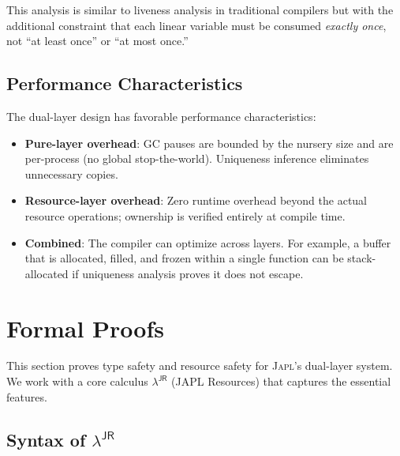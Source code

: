 \documentclass[11pt]{article}
\newcommand{\JAPL}{\textsc{Japl}}
\begin{document}
This analysis is similar to liveness analysis in traditional compilers
but with the additional constraint that each linear variable must be
consumed \emph{exactly once}, not ``at least once'' or ``at most
once.''

\subsection{Performance Characteristics}

The dual-layer design has favorable performance characteristics:

\begin{itemize}
  \item \textbf{Pure-layer overhead}: GC pauses are bounded by the
        nursery size and are per-process (no global stop-the-world).
        Uniqueness inference eliminates unnecessary copies.
  \item \textbf{Resource-layer overhead}: Zero runtime overhead beyond
        the actual resource operations; ownership is verified entirely
        at compile time.
  \item \textbf{Combined}: The compiler can optimize across layers.
        For example, a buffer that is allocated, filled, and frozen
        within a single function can be stack-allocated if uniqueness
        analysis proves it does not escape.
\end{itemize}


\section{Formal Proofs}\label{sec:proofs}

This section proves type safety and resource safety for \JAPL{}'s
dual-layer system.  We work with a core calculus $\lambda^{\mathsf{JR}}$
(JAPL Resources) that captures the essential features.

\subsection{Syntax of $\lambda^{\mathsf{JR}}$}
\end{document}
